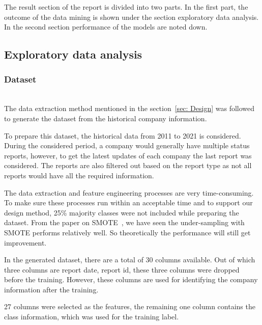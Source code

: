 
The result section of the report is divided into two parts. In the first part, the outcome of the data mining is shown under the section exploratory data analysis. In the second section performance of the models are noted down. 

\subsection{Exploratory data analysis}

\subsubsection{Dataset}\hspace*{\fill} \\
The data extraction method mentioned in the section~\ref{sec: Design} was followed to generate the dataset from the historical company information.

To prepare this dataset, the historical data from 2011 to 2021 is considered. During the considered period, a company would generally have multiple status reports, however, to get the latest updates of each company the last report was considered. The reports are also filtered out based on the report type as not all reports would have all the required information. 

The data extraction and feature engineering processes are very time-consuming. To make sure these processes run within an acceptable time and to support our design method, 25\% majority classes were not included while preparing the dataset. From the paper on SMOTE~\cite{2002}, we have seen the under-sampling with SMOTE performs relatively well. So theoretically the performance will still get improvement.

In the generated dataset, there are a total of 30 columns available. Out of which three columns are report date, report id, these three columns were dropped before the training. However, these columns are used for identifying the company information after the training. 

 27 columns were selected as the features, the remaining one column contains the class information, which was used for the training label.  

